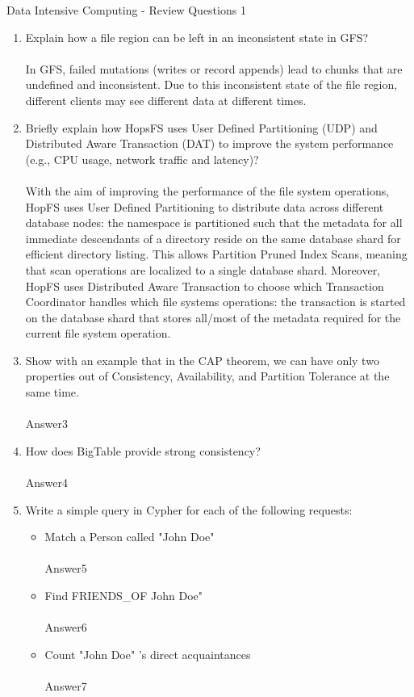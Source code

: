 \documentclass[]{report}
\begin{document}
\begin{center}
 {\Large Data Intensive Computing - Review Questions 1}
\end{center}
\vspace{1cm}
\justify
\begin{enumerate}
 \item Explain how a file region can be left in an inconsistent state in GFS?\\\\
In GFS, failed mutations (writes or record appends) lead to chunks that are undefined and inconsistent. Due to this inconsistent state of the file region, different clients may see different data at different times.

 
 \item Briefly explain how HopsFS uses User Defined Partitioning (UDP) and Distributed Aware Transaction (DAT) to improve the system performance (e.g., CPU usage, network traffic and latency)?\\\\
With the aim of improving the performance of the file system operations, HopFS uses User Defined Partitioning to distribute data across different database nodes: the namespace is partitioned
such that the metadata for all immediate descendants of a directory reside on the same database shard for efficient directory listing. This allows Partition Pruned Index Scans, meaning that scan operations are localized to a single database shard.
Moreover, HopFS uses Distributed Aware Transaction to choose which Transaction Coordinator handles which file systems operations: the transaction is started on the database shard that stores all/most of the metadata required for the current file system operation.

 
 \item Show with an example that in the CAP theorem, we can have only two properties out of Consistency, Availability, and Partition Tolerance at the same time.\\\\
 Answer3
 
 \item How does BigTable provide strong consistency?\\\\
 Answer4
 
 \item Write a simple query in Cypher for each of the following requests:
 \begin{itemize}
    	\item Match a Person called "John Doe"\\\\
	Answer5
        \item Find FRIENDS\_OF John Doe"\\\\
        Answer6
        \item Count "John Doe" 's direct acquaintances\\\\
        Answer7
  \end{itemize}

\end{enumerate}
\end{document}
